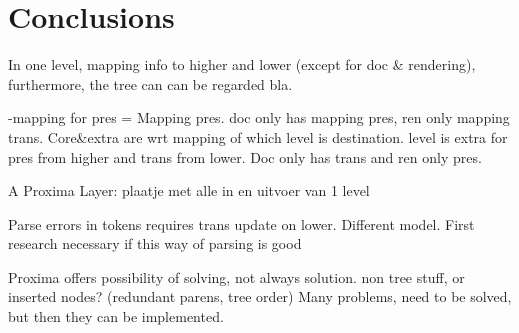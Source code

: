 

%																
\section{Conclusions}

In one level,  mapping info to higher and lower (except for doc \& rendering), furthermore, the tree can can be regarded bla.

-mapping for pres = Mapping pres. doc only has mapping pres, ren only mapping trans. Core\&extra are wrt mapping of which level is destination. level is extra for pres from higher and trans from lower. Doc only has trans  and ren only pres.



A Proxima Layer:
plaatje met alle in en uitvoer van 1 level


Parse errors in tokens requires trans update on lower. Different model. First research necessary if this way of parsing is good

Proxima offers possibility of solving, not always solution. non tree stuff, or inserted nodes? (redundant parens, tree order) Many problems, need to be solved, but then they can be implemented.




%																
%																
%																
%
%



%																
%																
%																
%
%
%

